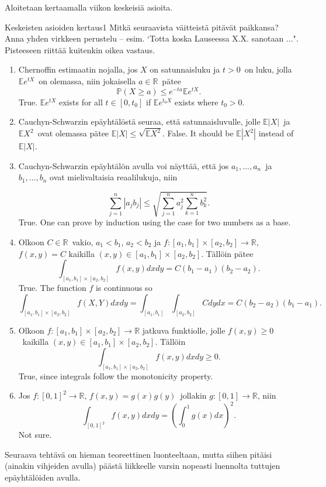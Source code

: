 \documentclass[11pt,a4paper]{amsart}
\newcommand{\R}{\mathbb{R}}
\newcommand{\E}{\mathbb{E}}
\newcommand{\1}{\mathbf{1}}
\renewcommand{\P}{\mathbb P}
\begin{document}
Aloitetaan kertaamalla viikon keskeisiä asioita.
\begin{Exercises}{Keskeisten asioiden kertaus}{1}
Mitkä seuraavista väitteistä pitävät paikkansa? Anna yhden virkkeen perustelu -- esim. `Totta koska Lauseessa X.X. sanotaan ...". Pisteeseen riittää kuitenkin oikea vastaus. 
\begin{enumerate}
\item Chernoffin estimaatin nojalla, jos $X$ on satunnaisluku ja $t>0$ on luku, jolla $\E e^{tX}$ on olemassa,  niin jokaisella $a\in \R$ pätee
\[
\P(X\geq a)\leq e^{-ta}\E e^{tX}.
\]
True. $ \E e^{tX} $ exists for all $ t \in [0, t_0]$ if $ \E e^{t_0 X} $ exists where $ t_0 > 0$.
\item Cauchyn-Schwarzin epäyhtälöstä seuraa, että satunnaisluvulle, jolle $\E |X|$ ja $\E X^2$ ovat olemassa pätee $\E |X|\leq \sqrt{\E X^2}$.
    False. It should be $ \E |X^2|$ instead of $ \E |X|$.
\item Cauchyn-Schwarzin epäyhtälön avulla voi näyttää, että jos $a_1,...,a_n$ ja $b_1,...,b_n$ ovat mielivaltaisia reaalilukuja, niin 

\[
\sum_{j=1}^n |a_j b_j|\leq \sqrt{\sum_{j=1}^n a_j^2\sum_{k=1}^n b_k^2}.
\]
True. One can prove by induction using the case for two numbers as a base.
\item Olkoon $C\in \R$ vakio, $a_1<b_1$, $a_2<b_2$ ja $f:[a_1,b_1]\times [a_2,b_2]\to \R$, $f(x,y)=C$ kaikilla $(x,y)\in [a_1,b_1]\times [a_2,b_2]$. Tällöin pätee
\[
 \int_{[a_1,b_1]\times [a_2,b_2]}f(x,y)dxdy=C(b_1-a_1)(b_2-a_2).
\]
True. The function $ f$ is continuous so 
\[
    \int_{[a_1,b_1] \times [a_2, b_2]}^{} f(X,Y) dx dy = \int_{[a_1, b_1]}^{} \int_{[a_2, b_2]}^{} C
    dy dx = C (b_2- a_2)(b_1 - a_1)
.\] 
\item Olkoon $f:[a_1,b_1]\times [a_2,b_2]\to \R$ jatkuva funktiolle, jolle $f(x,y)\geq 0$ kaikilla $(x,y)\in [a_1,b_1]\times [a_2,b_2]$. Tällöin 
\[
\int_{[a_1,b_1]\times [a_2,b_2]}f(x,y)dxdy\geq 0.
\]
True, since integrals follow the monotonicity property.
\item Jos $f:[0,1]^2\to \R$, $f(x,y)=g(x)g(y)$ jollakin $g:[0,1]\to \R$, niin 
\[
\int_{[0,1]^2}f(x,y)dxdy=\left(\int_0^1 g(x)dx\right)^2.
\]
Not sure.
\end{enumerate}
\end{Exercises}

Seuraava tehtävä on hieman teoreettinen luonteeltaan, mutta siihen pitäisi (ainakin vihjeiden avulla) päästä liikkeelle varsin nopeasti luennolta tuttujen epäyhtälöiden avulla.
\end{document}
